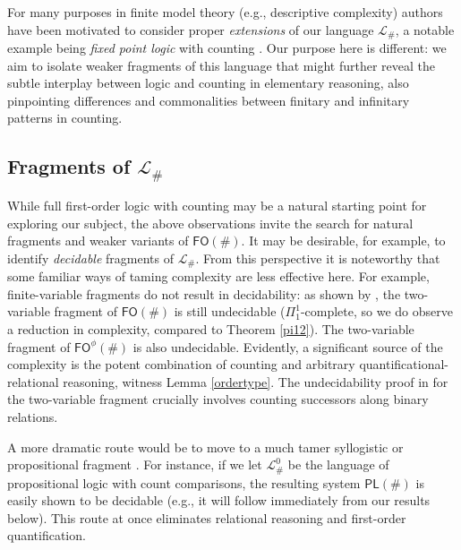 \documentclass[12pt,oneside,reqno]{amsart}
\theoremstyle{definition}
\begin{document}
For many purposes in finite model theory (e.g., descriptive complexity) authors have been motivated to consider proper \emph{extensions} of our language $\mathcal{L}_\#$, a notable example being \emph{fixed point logic} with counting \citep{Immerman1992}. Our purpose here is different: we aim to isolate weaker fragments of this language that might further reveal the subtle interplay between logic and counting in elementary reasoning, also pinpointing differences and commonalities between finitary and infinitary patterns in counting. 

\subsection{Fragments of $\mathcal{L}_\#$} While full first-order logic with counting may be a natural starting point for exploring our subject, the above observations invite the search for natural fragments and weaker variants of $\mathsf{FO}(\#)$. It may be desirable, for example, to identify \emph{decidable} fragments of $\mathcal{L}_\#$. From this perspective it is noteworthy that some familiar ways of taming complexity are less effective here. For example, finite-variable fragments do not result in decidability: as shown by \cite{Gradel1999}, the two-variable fragment of $\mathsf{FO}(\#)$ is still undecidable ($\Pi^1_1$-complete, so we do observe a reduction in complexity, compared to Theorem \ref{pi12}). The two-variable fragment of $\mathsf{FO}^\phi(\#)$ is also undecidable. Evidently, a significant source of the complexity is the potent combination of counting and arbitrary quantificational-relational reasoning, witness Lemma \ref{ordertype}. The undecidability proof in \citealt{Gradel1999} for the two-variable fragment crucially involves counting successors along binary relations.

A more dramatic route would be to move to a much tamer syllogistic or propositional fragment \citep{Moss2016,Ding2020}. For instance, if we let $\mathcal{L}_\#^0$ be the language of propositional logic with count comparisons, the resulting system $\mathsf{PL}(\#)$ is easily shown to be decidable (e.g., it will follow immediately from our results below). This route at once eliminates relational reasoning and first-order quantification. 

\vspace{1ex}
\end{document}
